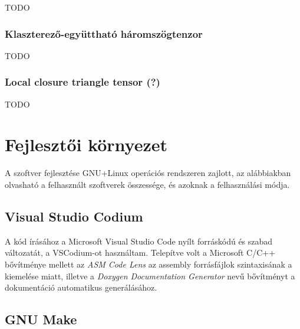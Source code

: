 \documentclass[12pt,numbers=noenddot]{report}
\begin{document}
TODO

\subsection*{Klaszterező-együttható háromszögtenzor}

TODO

\subsection*{Local closure triangle tensor (?)}

TODO



\chapter{Fejlesztői környezet}

A szoftver fejlesztése GNU+Linux operációs rendszeren zajlott, az alábbiakban
olvasható a felhasznált szoftverek összessége, és azoknak a felhasználási módja.


\section{Visual Studio Codium}

A kód írásához a Microsoft Visual Studio Code nyílt forráskódú és szabad
változatát, a VSCodium-ot használtam. Telepítve volt a Microsoft C/C++
bővítménye mellett az \textit{ASM Code Lens} az assembly forrásfájlok
szintaxisának a kiemelése miatt, illetve a
\textit{Doxygen Documentation Generator} nevű bővítményt a dokumentáció
automatikus generálásához.


\section{GNU Make}
\end{document}
